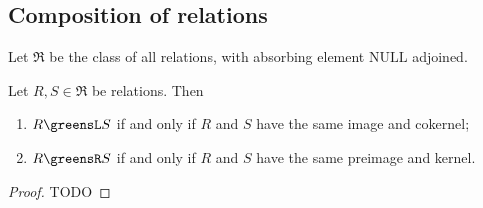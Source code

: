 \subsection{Composition of relations}
\begin{definition}
Let $\mathfrak{R}$ be the class of all relations, with absorbing element $\mathrm{NULL}$ adjoined.
\end{definition}

\begin{proposition}
Let $R,S \in \mathfrak{R}$ be relations. Then
\begin{enumerate}
\item $R \greensL S$ \textup{if and only if} $R$ and $S$ have the same image and cokernel;
\item $R \greensR S$ \textup{if and only if} $R$ and $S$ have the same preimage and kernel.
\end{enumerate}
\end{proposition}
\begin{proof}
TODO
\end{proof}